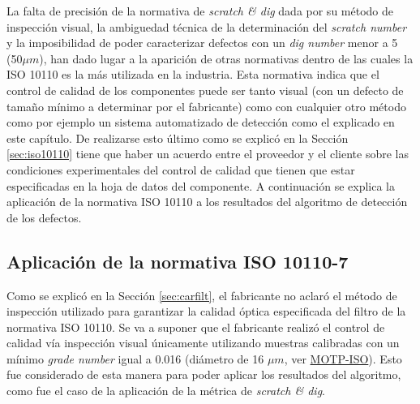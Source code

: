  La falta de precisión de la normativa de \textit{scratch \& dig} dada por su método de inspección visual, la ambiguedad técnica de la determinación del \textit{scratch number} y la imposibilidad de poder caracterizar defectos con un \textit{dig number} menor a 5 (50$\mu m$), han dado lugar a la aparición de otras normativas dentro de las cuales la ISO 10110 es la más utilizada en la industria. Esta normativa indica que el control de calidad de los componentes puede ser tanto visual (con un defecto de tamaño mínimo a determinar por el fabricante) como con cualquier otro método como por ejemplo un sistema automatizado de detección como el explicado en este capítulo. De realizarse esto último como se explicó en la Sección \ref{sec:iso10110} tiene que haber un acuerdo entre el proveedor y el cliente sobre las condiciones experimentales del control de calidad que tienen que estar especificadas en la hoja de datos del componente. A continuación se explica la aplicación de la normativa ISO 10110 a los resultados del algoritmo de detección de los defectos.
 
\singlespacing
\subsection{Aplicación de la normativa ISO 10110-7}
\label{sec:apiso}

\hspace{0.5cm}Como se explicó en la Sección \ref{sec:carfilt}, el fabricante no aclaró el método de inspección utilizado para garantizar la calidad óptica especificada del filtro de la normativa ISO 10110. Se va a suponer que el fabricante realizó el control de calidad vía inspección visual únicamente utilizando muestras calibradas con un mínimo \textit{grade number} igual a 0.016 (diámetro de 16 $\mu m$, ver \href{https://www.thorlabs.com/thorproduct.cfm?partnumber=MOTP-ISO}{MOTP-ISO}). Esto fue considerado de esta manera para poder aplicar los resultados del algoritmo, como fue el caso de la aplicación de la métrica de \textit{scratch \& dig}.

